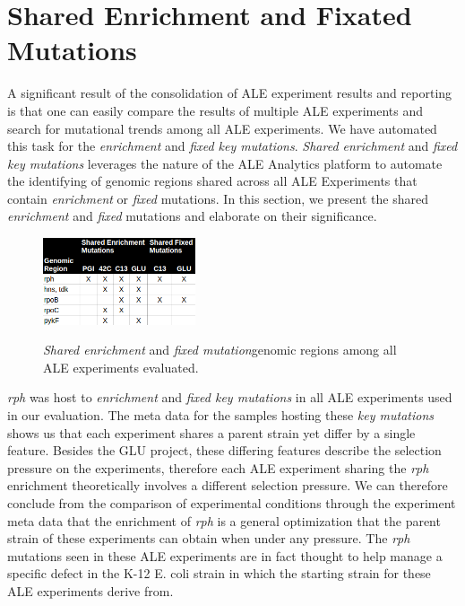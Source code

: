 \documentclass[12pt,final,masters,chapterheads]{ucsd}  %
\begin{document}
\section{Shared Enrichment and Fixated Mutations}
A significant result of the consolidation of ALE experiment results and reporting is that one can easily compare the results of multiple ALE experiments and search for mutational trends among all ALE experiments. We have automated this task for the \textit{enrichment} and \textit{fixed key mutations}. \textit{Shared enrichment} and \textit{fixed key mutations} leverages the nature of the ALE Analytics platform to automate the identifying of genomic regions shared across all ALE Experiments that contain \textit{enrichment} or \textit{fixed} mutations. In this section, we present the shared \textit{enrichment} and \textit{fixed} mutations and elaborate on their significance.%
\begin{figure}[H]
  \caption{\textit{Shared enrichment} and \textit{fixed mutation}genomic regions among all ALE experiments evaluated.}
  \centering
  \includegraphics[width=0.4\textwidth]{shared_enrichment_fixed_genomic_regions.png}
  \label{fig:shared_enrichment_fixed_genomic_regions}
\end{figure}
\textit{rph} was host to \textit{enrichment} and \textit{fixed key mutations} in all ALE experiments used in our evaluation. The meta data for the samples hosting these \textit{key mutations} shows us that each experiment shares a parent strain yet differ by a single feature. Besides the GLU project, these differing features describe the selection pressure on the experiments, therefore each ALE experiment sharing the \textit{rph} enrichment theoretically involves a different selection pressure. We can therefore conclude from the comparison of experimental conditions through the experiment meta data that the enrichment of \textit{rph} is a general optimization that the parent strain of these experiments can obtain when under any pressure. The \textit{rph} mutations seen in these ALE experiments are in fact thought to help manage a specific defect in the K-12 E. coli strain in which the starting strain for these ALE experiments derive from\cite{Conrad2009}.
\end{document}
